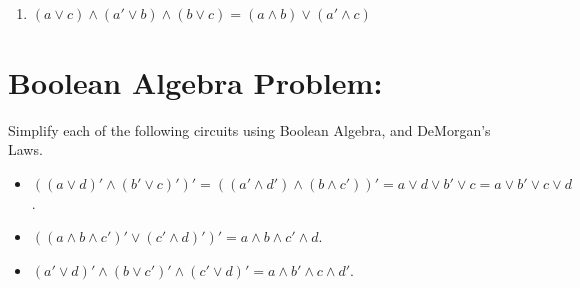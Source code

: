 \documentclass[12pt]{article}
\begin{document}
\begin{enumerate}[label=(\alph*)]
    \newpage\item $(a\vee c)\wedge(a'\vee b)\wedge(b\vee c)=(a\wedge b)\vee(a'\wedge c)$
    \newline{}
\end{enumerate}
\section{Boolean Algebra Problem:}
Simplify each of the following circuits using Boolean Algebra, and DeMorgan's Laws.
\begin{itemize}
    \item $((a\vee d)'\wedge(b'\vee c)')'=((a'\wedge d')\wedge(b\wedge c'))'=a\vee d\vee b'\vee c=a\vee b'\vee c \vee d$.
    \item $((a\wedge b \wedge c')'\vee(c'\wedge d)')'=a\wedge b\wedge c'\wedge d$.
    \item $(a'\vee d)'\wedge(b\vee c')'\wedge(c'\vee d)'=a\wedge b'\wedge c\wedge d'$.
\end{itemize}
\end{document}
